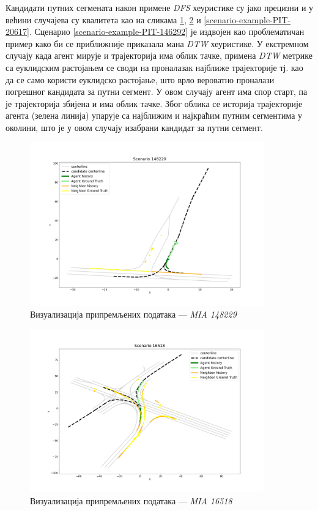 \documentclass[11pt,oneside]{memoir}
\begin{document}
Кандидати путних сегмената након примене \textit{DFS} хеуристике су јако прецизни и у већини случајева су квалитета као на
сликама \ref{scenario-example-MIA-148229}, \ref{scenario-example-MIA-16518} и \ref{scenario-example-PIT-20617}. Сценарио 
\ref{scenario-example-PIT-146292} је издвојен као проблематичан пример како би се приближније приказала мана \textit{DTW} хеуристике.
У екстремном случају када агент мирује и трајекторија има облик тачке, примена \textit{DTW} метрике са еуклидским растојањем се своди на
проналазак најближе трајекторије тј. као да се само користи еуклидско растојање, што врло вероватно проналази погрешног кандидата за путни сегмент.
У овом случају агент има спор старт, па је трајекторија збијена и има облик тачке. Због облика се историја трајекторије агента (зелена линија)
упарује са најближим и најкраћим путним сегментима у околини, што је у овом случају изабрани кандидат за путни сегмент.

\begin{figure}[H]
  \includegraphics[width=0.9\textwidth]{images/scenario_MIA_148229.png}
  \caption{Визуализација припремљених података --- \textit{MIA 148229}}
  \label{scenario-example-MIA-148229}
\end{figure}

\begin{figure}[H]
  \includegraphics[width=0.9\textwidth]{images/scenario_MIA_16518.png}
  \caption{Визуализација припремљених података --- \textit{MIA 16518}}
  \label{scenario-example-MIA-16518}
\end{figure}
\end{document}
